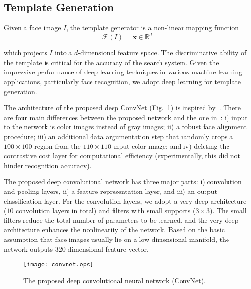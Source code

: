 \documentclass[10pt,journal,compsoc]{IEEEtran}
\def \x {{\mathbf{x}}}
\begin{document}
\subsection{Template Generation}\label{sec:template_generation}
Given a face image $I$, the template generator is a non-linear mapping function
\begin{equation}
\mathcal{F}(I)=\x \in \mathbb{R}^d
\end{equation}

\noindent which projects $I$ into a $d$-dimensional feature space. The discriminative ability of the template is critical for the accuracy of the search system. Given the impressive performance of deep learning techniques in various machine learning applications, particularly face recognition, we adopt deep learning for template generation.

The architecture of the proposed deep ConvNet (Fig.~\ref{fig:architecture}) is inspired by~\cite{self:wan2014, DB:CASIA}.
There are four main differences between the proposed network and the one in~\cite{DB:CASIA}: i) input to the network is color images instead of gray images; ii) a robust face alignment procedure; iii) an additional data argumentation step that randomly crops a $100\times100$ region from the $110\times110$ input color image; and iv) deleting the contrastive cost layer for computational efficiency (experimentally, this did not hinder recognition accuracy).

The proposed deep convolutional network has three major parts: i) convolution and pooling layers, ii) a feature representation layer, and iii) an output classification layer. For the convolution layers, we adopt a very deep architecture~\cite{dl:verydeep} ($10$ convolution layers in total) and filters with small supports ($3\times3$). The small filters reduce the total number of parameters to be learned, and the very deep architecture enhances the nonlinearity of the network. Based on the basic assumption that face images usually lie on a low dimensional manifold, the network outputs $320$ dimensional feature vector.
\begin{figure}[htbp]
  \centering
    \texttt{[image: convnet.eps]}
  \caption{The proposed deep convolutional neural network (ConvNet).}\label{fig:architecture}
\end{figure}
\end{document}

